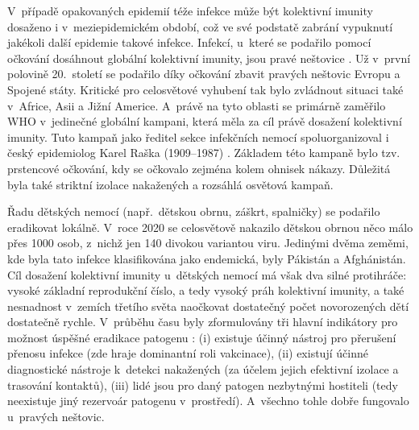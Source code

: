 V~případě opakovaných epidemií téže infekce může být kolektivní imunity do\-sa\-že\-no i v~meziepidemickém období, což ve své podstatě zabrání vypuknutí jakékoli další epidemie takové infekce. Infekcí, u~které se podařilo pomocí očkování dosáhnout globální kolektivní imunity, jsou pravé neštovice \cite{smallpox1}. Už v~první polovině 20.\ století se podařilo díky očkování zbavit pravých neštovic Evropu a Spojené státy. Kritické pro celosvětové vyhubení tak bylo zvládnout situaci také v~Africe, Asii a Jižní Americe. A~právě na tyto oblasti se primárně zaměřilo WHO v~jedinečné globální kampani, která měla za cíl právě dosažení kolektivní imunity. Tuto kampaň jako ředitel sekce infekčních nemocí spoluorganizoval i český epidemiolog Karel Raška (1909--1987) \cite{smallpox2}. Základem této kampaně bylo tzv. prstencové očkování, kdy se očkovalo zejména kolem ohnisek nákazy. Důležitá byla také striktní izolace nakažených a rozsáhlá osvětová kampaň.

Řadu dětských nemocí (např.\ dětskou obrnu, záškrt, spalničky) se podařilo eradikovat lokálně. V~roce 2020 se celosvětově nakazilo dětskou obrnou něco málo přes 1000 osob, z~nichž jen 140 divokou variantou viru. Jedinými dvěma zeměmi, kde byla tato infekce klasifikována jako endemická, byly Pákistán a Afghánistán. Cíl dosažení kolektivní imunity u~dětských nemocí má však dva silné protihráče: vysoké základní reprodukční číslo, a tedy vysoký práh kolektivní imunity, a také nesnadnost v~zemích třetího světa naočkovat dostatečný počet novorozených dětí dostatečně rychle. V~průběhu času byly zformulovány tři hlavní indikátory pro možnost úspěšné eradikace patogenu \cite{Dowdle1999}: (i) existuje účinný nástroj pro přerušení přenosu infekce (zde hraje dominantní roli vakcinace), (ii) existují účinné diagnostické nástroje k~detekci nakažených (za účelem jejich efektivní izolace a trasování kontaktů), (iii) lidé jsou pro daný patogen nezbytnými hostiteli (tedy neexistuje jiný rezervoár patogenu v~prostředí). A~všechno tohle dobře fungovalo u~pravých neštovic.

